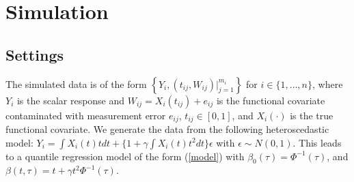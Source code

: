 \documentclass[times,sort&compress,3p]{elsarticle}
\theoremstyle{plain}%
\theoremstyle{definition}
\begin{document}




\section{Simulation} 
\label{section:flqr.simulation}

\subsection{Settings}
\label{section:setting} 
The simulated data is of the form $\left\{Y_i, (t_{ij}, W_{ij})|_{j = 1}^{m_i} \right\}$ for $i \in \{1, \ldots, n\}$, where $Y_i$ is the scalar response and $W_{ij} =X_i(t_{ij}) +e_{ij}$ is the functional covariate contaminated with measurement error $e_{ij}$, $t_{ij}\in [0,1]$, and $X_i(\cdot)$ is the true functional covariate.  We generate the data from the following heteroscedastic model:
$Y_i = \int X_i(t) t dt + \{1 + \gamma \int X_i(t) t^2
dt\} \epsilon$ with $\epsilon \sim N(0, 1)$. This leads to a quantile regression model of the form (\ref{model}) 
with $\beta_0(\tau) = \Phi^{-1}(\tau)$, and $\beta(t, \tau) = t
+ \gamma t^2 \Phi^{-1}(\tau)$. {}
\end{document}
